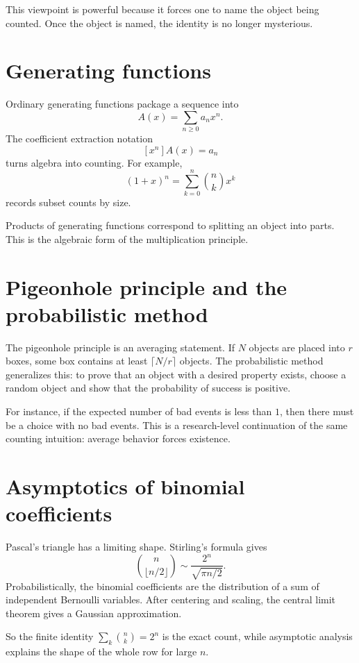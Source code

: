 This viewpoint is powerful because it forces one to name the object being counted.  Once the object is named, the identity is no longer mysterious.

\section{Generating functions}

Ordinary generating functions package a sequence into
\[
  A(x)=\sum_{n\ge0}a_nx^n.
\]
The coefficient extraction notation
\[
  [x^n]A(x)=a_n
\]
turns algebra into counting.  For example,
\[
  (1+x)^n=\sum_{k=0}^n\binom nkx^k
\]
records subset counts by size.

Products of generating functions correspond to splitting an object into parts.  This is the algebraic form of the multiplication principle.

\section{Pigeonhole principle and the probabilistic method}

The pigeonhole principle is an averaging statement.  If \(N\) objects are placed into \(r\) boxes, some box contains at least \(\lceil N/r\rceil\) objects.  The probabilistic method generalizes this: to prove that an object with a desired property exists, choose a random object and show that the probability of success is positive.

For instance, if the expected number of bad events is less than \(1\), then there must be a choice with no bad events.  This is a research-level continuation of the same counting intuition: average behavior forces existence.

\section{Asymptotics of binomial coefficients}

Pascal's triangle has a limiting shape.  Stirling's formula gives
\[
  \binom n{\lfloor n/2\rfloor}
  \sim \frac{2^n}{\sqrt{\pi n/2}}.
\]
Probabilistically, the binomial coefficients are the distribution of a sum of independent Bernoulli variables.  After centering and scaling, the central limit theorem gives a Gaussian approximation.

So the finite identity \(\sum_k\binom nk=2^n\) is the exact count, while asymptotic analysis explains the shape of the whole row for large \(n\).

